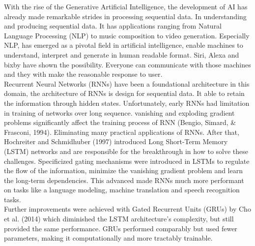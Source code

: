 \documentclass[12pt,a4paper]{article}
\begin{document}
With the rise of the Generative Artificial Intelligence, the development of AI has already made remarkable strides in processing sequential data. In understanding and producing sequential data. It has applications ranging from Natural Language Processing (NLP) to music composition to video generation. Especially NLP, has emerged as a pivotal field in artificial intelligence, enable machines to understand, interpret and generate in human readable format. Siri, Alexa and bixby have shown the possibility. Everyone can communicate with those machines and they with make the reasonable response to user.\\[2ex]
Recurrent Neural Networks (RNNs) have been a foundational architecture in this domain, the architecture of RNNs is design for sequential data. It able to retain the information through hidden states. Unfortunately, early RNNs had limitation in training of networks over long sequence. vanishing and exploding gradient problems significantly affect the training process of RNN (Bengio, Simard, \& Frasconi, 1994). Eliminating many practical applications of RNNs. After that, Hochreiter and Schmidhuber (1997) introduced Long Short-Term Memory (LSTM) networks and are responsible for the breakthrough in how to solve these challenges. Specificized gating mechanisms were introduced in LSTMs to regulate the flow of the information, minimize the vanishing gradient problem and learn the long-term dependencies. This advanced made RNNs much more performant on tasks like a language modeling, machine translation and speech recognition tasks.\\[2ex]
Further improvements were achieved with Gated Recurrent Units (GRUs) by Cho et al. (2014) which diminished the LSTM architecture's complexity, but still provided the same performance. GRUs performed comparably but used fewer parameters, making it computationally and more tractably trainable.

\newpage
\end{document}
